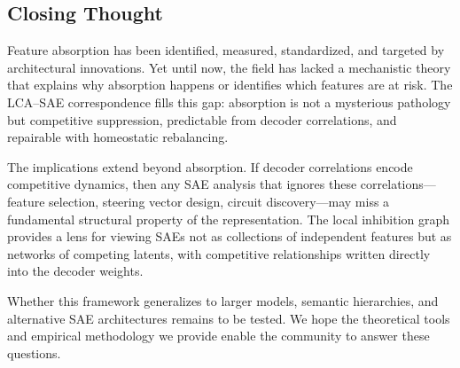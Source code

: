 \documentclass{article}
\begin{document}
\subsection{Closing Thought}

Feature absorption has been identified, measured, standardized, and targeted by architectural innovations. Yet until now, the field has lacked a mechanistic theory that explains why absorption happens or identifies which features are at risk. The LCA--SAE correspondence fills this gap: absorption is not a mysterious pathology but competitive suppression, predictable from decoder correlations, and repairable with homeostatic rebalancing.

The implications extend beyond absorption. If decoder correlations encode competitive dynamics, then any SAE analysis that ignores these correlations---feature selection, steering vector design, circuit discovery---may miss a fundamental structural property of the representation. The local inhibition graph provides a lens for viewing SAEs not as collections of independent features but as networks of competing latents, with competitive relationships written directly into the decoder weights.

Whether this framework generalizes to larger models, semantic hierarchies, and alternative SAE architectures remains to be tested. We hope the theoretical tools and empirical methodology we provide enable the community to answer these questions.



\end{document}
